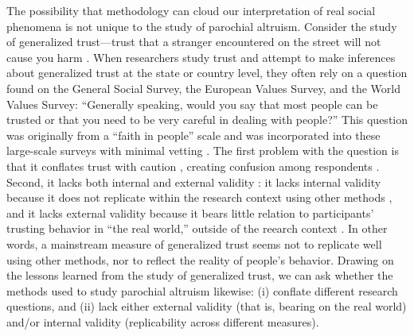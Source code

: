 \documentclass[bibauthoryear]{aa}
\begin{document}
The possibility that methodology can cloud our interpretation of real social phenomena is not unique to the study of parochial altruism. Consider the study of generalized trust---trust that a stranger encountered on the street will not cause you harm \citep{yamagishi2011trust}. When researchers study trust and attempt to make inferences about generalized trust at the state or country level, they often rely on a question found on the General Social Survey, the European Values Survey, and the World Values Survey: ``Generally speaking, would you say that most people can be trusted or that you need to be very careful in dealing with people?'' This question was originally from a ``faith in people'' scale and was incorporated into these large-scale surveys with minimal vetting \citep{miller2003surveys}. The first problem with the question is that it conflates trust with caution \citep{miller2003surveys}, creating confusion among respondents \citep{nannestad2008have}. Second, it lacks both internal and external validity \citep{loewenstein1999experimental}: it lacks internal validity because it does not replicate within the research context using other methods \citep{glaeser2000measuring}, and it lacks external validity because it bears little relation to participants' trusting behavior in ``the real world,'' outside of the reearch context \citep{nannestad2008have}. In other words, a  mainstream measure of generalized trust seems not to replicate well using other methods, nor to reflect the reality of people's behavior. Drawing on the lessons learned from the study of generalized trust, we can ask whether the methods used to study parochial altruism likewise: (i) conflate different research questions, and (ii) lack either external validity (that is, bearing on the real world) and/or internal validity (replicability across different measures). 
\end{document}
